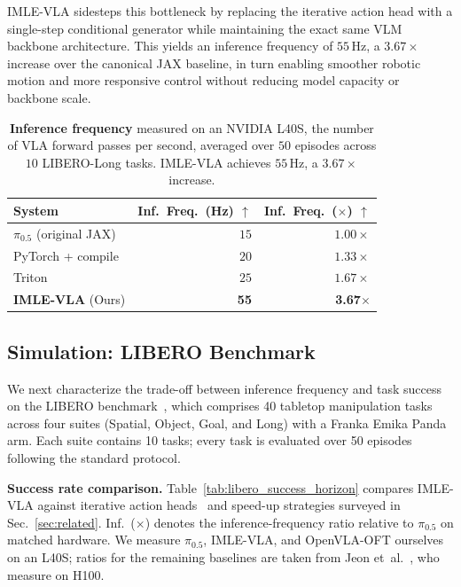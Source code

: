 \documentclass[letterpaper, 10 pt, conference]{ieeeconf}  %
\begin{document}
IMLE-VLA sidesteps this bottleneck by replacing the iterative action head with a single-step conditional generator while maintaining the exact same VLM backbone architecture. This yields an inference frequency of $55$\,Hz, a $3.67\times$ increase over the canonical JAX baseline, in turn enabling smoother robotic motion and more responsive control without reducing model capacity or backbone scale.

\begin{table}[htbp]
    \centering
    \footnotesize
    \setlength{\tabcolsep}{2pt}
    \vspace{0.9em}
    \begin{tabular}{l r r}
        \hline
        \textbf{System} & \textbf{Inf.\ Freq.\ (Hz)} $\uparrow$ & \textbf{Inf.\ Freq.\ ($\times$)} $\uparrow$ \\
        \hline
        $\pi_{0.5}$ (original JAX) & $15$ & $1.00\times$ \\
        PyTorch + compile & $20$ & $1.33\times$ \\
        Triton & $25$ & $1.67\times$ \\
        \textbf{IMLE-VLA} (Ours) & \textbf{55} & \textbf{3.67$\times$} \\
        \hline
    \end{tabular}

    \vspace{0.3em}
    \caption{\textbf{Inference frequency} measured on an NVIDIA L40S, the number of VLA forward passes per second, averaged over $50$ episodes across $10$ LIBERO-Long tasks. IMLE-VLA achieves $55$\,Hz, a $3.67\times$ increase.}
    \label{tab:inference_frequency}
    \vspace{1em}
\end{table}

\subsection{Simulation: LIBERO Benchmark}

\label{sec:libero_benchmark}

We next characterize the trade-off between inference frequency and task success on the LIBERO benchmark~\cite{liu2023libero}, which comprises 40 tabletop manipulation tasks across four suites (Spatial, Object, Goal, and Long) with a Franka Emika Panda arm. Each suite contains 10 tasks; every task is evaluated over 50 episodes following the standard protocol.

\textbf{Success rate comparison.}
Table~\ref{tab:libero_success_horizon} compares IMLE-VLA against iterative action heads~\cite{black2024pi0,black2025pi05} and speed-up strategies surveyed in Sec.~\ref{sec:related}. Inf.\ ($\times$) denotes the inference-frequency ratio relative to $\pi_{0.5}$ on matched hardware. We measure $\pi_{0.5}$, IMLE-VLA, and OpenVLA-OFT ourselves on an L40S; ratios for the remaining baselines are taken from Jeon et~al.~\cite{jeon2025shallow}, who measure on H100.
\end{document}
